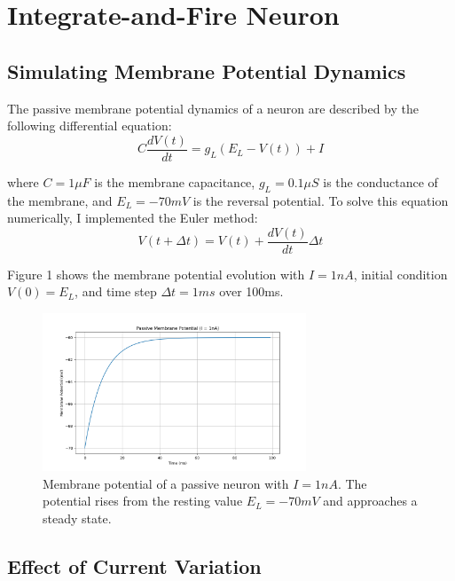 \documentclass[11pt,a4paper]{article}
\begin{document}
\section{Integrate-and-Fire Neuron}

\subsection{Simulating Membrane Potential Dynamics}

The passive membrane potential dynamics of a neuron are described by the following differential equation:
\begin{equation}
C \frac{dV(t)}{dt} = g_L(E_L - V(t)) + I
\end{equation}

where $C = 1\mu F$ is the membrane capacitance, $g_L = 0.1\mu S$ is the conductance of the membrane, and $E_L = -70mV$ is the reversal potential. To solve this equation numerically, I implemented the Euler method:
\begin{equation}
V(t + \Delta t) = V(t) + \frac{dV(t)}{dt} \Delta t
\end{equation}

Figure 1 shows the membrane potential evolution with $I = 1nA$, initial condition $V(0) = E_L$, and time step $\Delta t = 1ms$ over 100ms.

\begin{figure}[H]
\centering
\includegraphics[width=0.7\textwidth]{fig1.png}

\caption{Membrane potential of a passive neuron with $I = 1nA$. The potential rises from the resting value $E_L = -70mV$ and approaches a steady state.}
\label{fig:passive_membrane}
\end{figure}

\subsection{Effect of Current Variation}
\end{document}

